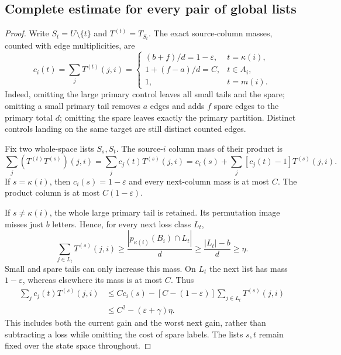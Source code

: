 \documentclass[11pt,reqno]{amsart}
\numberwithin{equation}{section}
\theoremstyle{definition}
\newcommand{\eps}{\varepsilon}
\begin{document}
\subsection{Complete estimate for every pair of global lists}
\begin{proof}
Write $S_t=U\setminus\{t\}$ and $T^{(t)}=T_{S_t}$.
The exact source-column masses, counted with edge multiplicities,
are
\begin{equation}\label{eq:gain-columns}
 c_i(t)=\sum_jT^{(t)}(j,i)=
 \begin{cases}
 (b+f)/d=1-\eps,&t=\kappa(i),\\
 1+(f-a)/d=C,&t\in A_i,\\
 1,&t=m(i).
 \end{cases}
\end{equation}
Indeed, omitting the large primary control leaves all small tails
and the spare; omitting a small primary tail removes $a$ edges
and adds $f$ spare edges to the primary total $d$; omitting the
spare leaves exactly the primary partition. Distinct controls landing
on the same target are still distinct counted edges.

Fix two whole-space lists $S_s,S_t$. The source-$i$ column mass
of their product is
\begin{equation}\label{eq:gain-identity}
 \sum_j(T^{(t)}T^{(s)})(j,i)
 =\sum_jc_j(t)T^{(s)}(j,i)
 =c_i(s)+\sum_j[c_j(t)-1]T^{(s)}(j,i).
\end{equation}
If $s=\kappa(i)$, then $c_i(s)=1-\eps$ and every next-column
mass is at most $C$. The product column is at most $C(1-\eps)$.

If $s\ne\kappa(i)$, the whole large primary tail is retained.
Its permutation image misses just $b$ letters. Hence, for every
next loss class $L_t$,
\begin{equation}\label{eq:gain-landing}
 \sum_{j\in L_t}T^{(s)}(j,i)
 \ge\frac{|p_{\kappa(i)}(B_i)\cap L_t|}{d}
 \ge\frac{|L_t|-b}{d}\ge\eta.
\end{equation}
Small and spare tails can only increase this mass. On $L_t$ the
next list has mass $1-\eps$, whereas elsewhere its mass is at
most $C$. Thus
\begin{align}
 \sum_jc_j(t)T^{(s)}(j,i)
 &\le Cc_i(s)-[C-(1-\eps)]
             \sum_{j\in L_t}T^{(s)}(j,i)\nonumber\\
 &\le C^2-(\eps+\gamma)\eta.
 \label{eq:gain-pair}
\end{align}
This includes both the current gain and the worst next gain, rather
than subtracting a loss while omitting the cost of spare labels.
The lists $s,t$ remain fixed over the state space throughout.


\end{proof}
\end{document}
